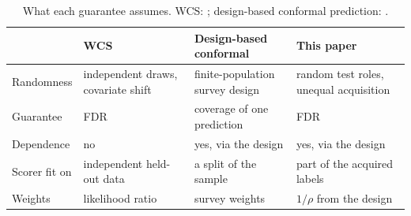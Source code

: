 \documentclass[twoside]{article}
\begin{document}
\begin{table}[t]
\centering\footnotesize\setlength{\tabcolsep}{3pt}
\caption{What each guarantee assumes. WCS: \citet{jin2026weighted}; design-based conformal prediction: \citet{wieczorek2023design}.}
\label{tab:novelty}
\begin{tabular}{@{}>{\raggedright\arraybackslash}p{}>{\raggedright\arraybackslash}p{}>{\raggedright\arraybackslash}p{}>{\raggedright\arraybackslash}p{}@{}}
\toprule
 & WCS & Design-based conformal & This paper\\
\midrule
Randomness & independent draws, covariate shift & finite-population survey design & random test roles, unequal acquisition\\
Guarantee & FDR & coverage of one prediction & FDR\\
Dependence & no & yes, via the design & yes, via the design\\
Scorer fit on & independent held-out data & a split of the sample & part of the acquired labels\\
Weights & likelihood ratio & survey weights & $1/\rho$ from the design\\
\bottomrule
\end{tabular}
\end{table}
\end{document}
